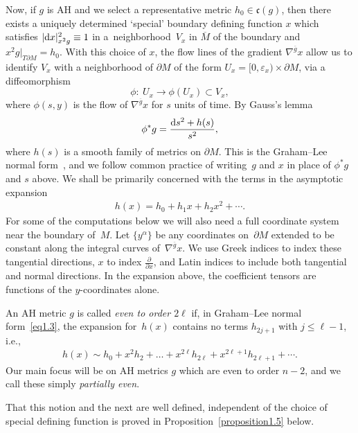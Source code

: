 \documentclass[pdftex]{sigma}
\numberwithin{equation}{section}
\newcommand{\vep}{\varepsilon}
\newcommand{\del}{\partial}
\newcommand{\olg}{\overline{g}}
\newcommand{\frakc}{\mathfrak c}
\newcommand{\Mbar}{\overline{M}}
\begin{document}
Now, if $g$ is AH and we select a representative metric $h_0 \in \frakc(g)$, then there exists a uniquely determined
`special' boundary defining function $x$ which satisfies $|{\rm d}x|^2_{x^2 g} \equiv 1$ in a~neighborhood~$V_x$ in $\Mbar$ of the boundary and $x^2 g|_{T \del M} = h_0$.
With this choice of $x$, the flow lines of the gradient $\nabla^{\olg} x$ allow us to identify $V_x$ with a neighborhood of $\del M$ of the form $U_x = [0,\vep_x) \times \del M$, via a diffeomorphism
\[ \phi\colon \ U_x \longrightarrow \phi(U_x) \subset V_x, \]
where $\phi(s,y)$ is the flow of $\nabla^{\olg} x$ for $s$ units of time. By Gauss's lemma
\begin{gather} \label{eq1.3}
\phi^*g = \frac{{\rm d}s^2 + h(s)}{s^2},
\end{gather}
where $h(s)$ is a smooth family of metrics on $\del M$. This is the Graham--Lee normal form~\cite{GL}, and we follow common practice of writing~$g$ and $x$ in place of $\phi^* g$ and $s$ above. We shall be primarily concerned with the terms in the asymptotic expansion
\begin{gather*}
h(x) = h_0 + h_1 x + h_2 x^2 + \cdots.%
\end{gather*}
For some of the computations below we will also need a full coordinate system near the boundary of~$M$. Let $\{y^{\alpha}\}$ be any coordinates on~$\partial M$ extended to be constant along the integral curves of~$\nabla^{\olg} x$. We use Greek indices to index these tangential directions, $x$ to index $\frac{\partial}{\partial x}$, and Latin indices to include both tangential and normal directions. In the expansion above, the coefficient tensors are functions of the $y$-coordinates alone.

\begin{Definition}\label{definition1.1} \label{def1} An AH metric $g$ is called \emph{even to order $2\ell$} if, in Graham--Lee normal form~\eqref{eq1.3}, the expansion for~$h(x)$ contains no terms $h_{2j+1}$ with $j \leq \ell-1$, i.e.,
\begin{gather*}%
h(x) \sim h_0+x^2h_2 +\dots +x^{2\ell}h_{2\ell} +x^{2\ell+1}h_{2\ell+1}+ \cdots.
\end{gather*}
Our main focus will be on AH metrics $g$ which are even to order $n-2$, and we call these simply \emph{partially even}.
\end{Definition}

That this notion and the next are well defined, independent of the choice of special defining function is proved in Proposition~\ref{proposition1.5} below.
\end{document}

